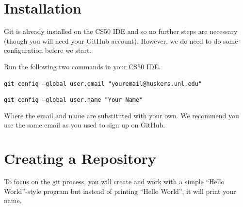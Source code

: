 \documentclass[12pt]{scrartcl}
\begin{document}
\section{Installation}

Git is already installed on the CS50 IDE and so no further
steps are necessary (though you will need your GitHub account).
However, we do need to do some configuration before we start.

Run the following two commands in your CS50 IDE.  

\texttt{git config --global user.email "youremail@huskers.unl.edu"}

\texttt{git config --global user.name "Your Name"}

Where the email and name are substituted with your own.  We 
recommend you use the same email as you used to sign up on GitHub.

\section{Creating a Repository}

To focus on the git process, you will create and work with a simple
``Hello World''-style program but instead of printing ``Hello World'', 
it will print your name. 
\end{document}
